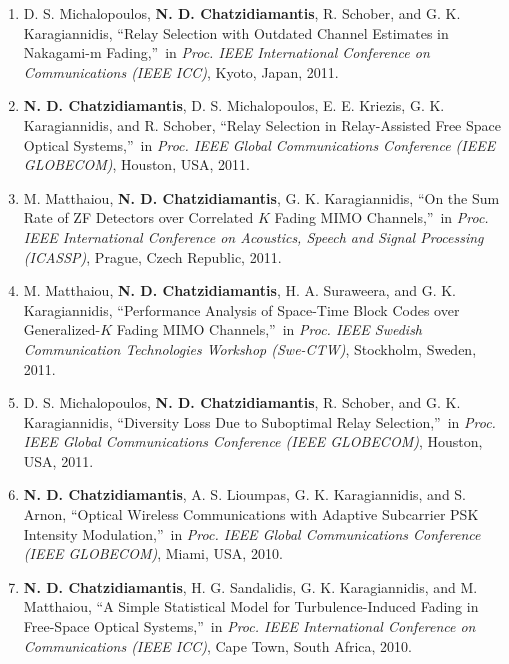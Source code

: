 \documentclass[11pt]{article}
\begin{document}
\begin{enumerate}
\item D. S. Michalopoulos,  \textbf{N. D. Chatzidiamantis}, R. Schober, and G. K. Karagiannidis,
\textquotedblleft Relay Selection with Outdated Channel Estimates in Nakagami-m
Fading,\textquotedblright\ in \emph{Proc. IEEE International Conference on Communications (IEEE ICC)}, Kyoto,
Japan, 2011.

\item  \textbf{N. D. Chatzidiamantis}, D. S. Michalopoulos, E. E. Kriezis, G. K. Karagiannidis, and R. Schober,
\textquotedblleft Relay Selection in Relay-Assisted Free Space Optical Systems,\textquotedblright\ in
\emph{Proc. IEEE Global Communications Conference (IEEE GLOBECOM)}, Houston, USA, 2011.

\item M. Matthaiou,  \textbf{N. D. Chatzidiamantis}, G. K. Karagiannidis, \textquotedblleft On the Sum Rate
of ZF Detectors over Correlated $K$ Fading MIMO Channels,\textquotedblright\ in \emph{Proc. IEEE International
Conference on Acoustics, Speech and Signal Processing (ICASSP)}, Prague, Czech Republic, 2011.

\item M. Matthaiou,  \textbf{N. D. Chatzidiamantis}, H. A. Suraweera, and G. K. Karagiannidis,
\textquotedblleft Performance Analysis of Space-Time Block Codes over Generalized-$K$ Fading MIMO
Channels,\textquotedblright\ in \emph{Proc. IEEE Swedish Communication Technologies Workshop (Swe-CTW)},
Stockholm, Sweden, 2011.

\item D. S. Michalopoulos,  \textbf{N. D. Chatzidiamantis}, R. Schober, and G. K. Karagiannidis,
\textquotedblleft Diversity Loss Due to Suboptimal Relay Selection,\textquotedblright\ in \emph{Proc.
IEEE Global Communications Conference (IEEE GLOBECOM)}, Houston, USA, 2011.

\item  \textbf{N. D. Chatzidiamantis}, A. S. Lioumpas, G. K. Karagiannidis, and S. Arnon,
\textquotedblleft Optical Wireless Communications with Adaptive Subcarrier PSK Intensity
Modulation,\textquotedblright\ in \emph{Proc. IEEE Global Communications Conference (IEEE GLOBECOM)}, Miami, USA,
2010.

\item  \textbf{N. D. Chatzidiamantis}, H. G. Sandalidis, G. K. Karagiannidis, and M. Matthaiou,
\textquotedblleft A Simple Statistical Model for Turbulence-Induced Fading in Free-Space Optical
Systems,\textquotedblright\ in \emph{Proc. IEEE International Conference on Communications (IEEE ICC)}, Cape Town,
South Africa, 2010.


\end{enumerate}
\end{document}
